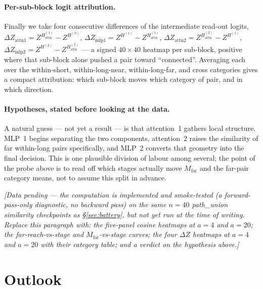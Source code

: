 \documentclass[11pt,a4paper]{article}
\begin{document}
\paragraph{Per-sub-block logit attribution.} Finally we take four consecutive
differences of the intermediate read-out logits,
$\Delta Z_{\mathrm{attn1}}=Z^{H_{\mathrm{attn}}^{(1)}}-Z^{H^{(0)}}$,
$\Delta Z_{\mathrm{mlp1}}=Z^{H^{(1)}}-Z^{H_{\mathrm{attn}}^{(1)}}$,
$\Delta Z_{\mathrm{attn2}}=Z^{H_{\mathrm{attn}}^{(2)}}-Z^{H^{(1)}}$,
$\Delta Z_{\mathrm{mlp2}}=Z^{H^{(2)}}-Z^{H_{\mathrm{attn}}^{(2)}}$ --- a signed
$40\times40$ heatmap per sub-block, positive where that sub-block alone
pushed a pair toward ``connected''. Averaging each over the within-short,
within-long-near, within-long-far, and cross categories gives a compact
attribution: which sub-block moves which category of pair, and in which
direction.

\paragraph{Hypotheses, stated before looking at the data.} A natural guess ---
not yet a result --- is that attention~1 gathers local structure, MLP~1
begins separating the two components, attention~2 raises the similarity of
far within-long pairs specifically, and MLP~2 converts that geometry into the
final decision. This is one plausible division of labour among several; the
point of the probe above is to read off which stages actually move
$M_{\mathrm{far}}$ and the far-pair category means, not to assume this
split in advance.

\emph{[Data pending --- the computation is implemented and smoke-tested (a
forward-pass-only diagnostic, no backward pass) on the same $n{=}40$
path\_union similarity checkpoints as \S\ref{sec:battery}, but not yet run at
the time of writing. Replace this paragraph with: the five-panel cosine
heatmaps at $a=4$ and $a=20$; the far-reach-vs-stage and
$M_{\mathrm{far}}$-vs-stage curves; the four $\Delta Z$ heatmaps at $a=4$ and
$a=20$ with their category table; and a verdict on the hypothesis above.]}

\section{Outlook}
\label{sec:outlook}
\end{document}
